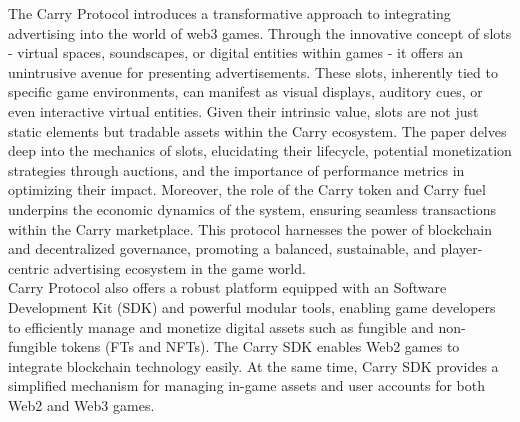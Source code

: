 \documentclass[
10pt, %
a4paper, %
oneside, %
headinclude,footinclude, %
BCOR5mm, %
]{scrartcl}
\begin{document}
The Carry Protocol introduces a transformative approach to integrating advertising into the world of web3 games. Through the innovative concept of slots - virtual spaces, soundscapes, or digital entities within games - it offers an unintrusive avenue for presenting advertisements. These slots, inherently tied to specific game environments, can manifest as visual displays, auditory cues, or even interactive virtual entities. Given their intrinsic value, slots are not just static elements but tradable assets within the Carry ecosystem. The paper delves deep into the mechanics of slots, elucidating their lifecycle, potential monetization strategies through auctions, and the importance of performance metrics in optimizing their impact. Moreover, the role of the Carry token and Carry fuel underpins the economic dynamics of the system, ensuring seamless transactions within the Carry marketplace. This protocol harnesses the power of blockchain and decentralized governance, promoting a balanced, sustainable, and player-centric advertising ecosystem in the game world. \\

Carry Protocol also offers a robust platform equipped with an Software Development Kit (SDK) and powerful modular tools, enabling game developers to efficiently manage and monetize digital assets such as fungible and non-fungible tokens (FTs and NFTs). The Carry SDK enables Web2 games to integrate blockchain technology easily. At the same time, Carry SDK provides a simplified mechanism for managing in-game assets and user accounts for both Web2 and Web3 games. 






\newpage %

\end{document}
